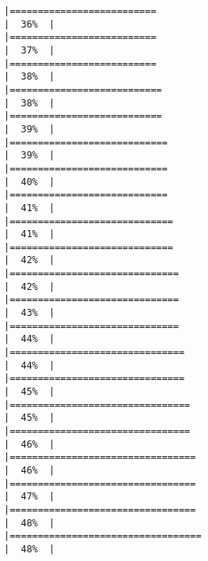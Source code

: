 \documentclass[10pt,letterpaper]{article}
\begin{document}
\begin{verbatim}
|==========================                                            |  36%  |                                                                              |==========================                                            |  37%  |                                                                              |==========================                                            |  38%  |                                                                              |===========================                                           |  38%  |                                                                              |===========================                                           |  39%  |                                                                              |============================                                          |  39%  |                                                                              |============================                                          |  40%  |                                                                              |============================                                          |  41%  |                                                                              |=============================                                         |  41%  |                                                                              |=============================                                         |  42%  |                                                                              |==============================                                        |  42%  |                                                                              |==============================                                        |  43%  |                                                                              |==============================                                        |  44%  |                                                                              |===============================                                       |  44%  |                                                                              |===============================                                       |  45%  |                                                                              |================================                                      |  45%  |                                                                              |================================                                      |  46%  |                                                                              |=================================                                     |  46%  |                                                                              |=================================                                     |  47%  |                                                                              |=================================                                     |  48%  |                                                                              |==================================                                    |  48%  |                                                                              
\end{verbatim}
\end{document}
